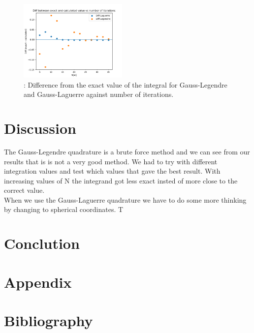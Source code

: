 \documentclass{article}
\begin{document}
\begin{figure}[hbt]
\begin{center}
    \includegraphics[width=200px]{Leg_lag_diff.png}
    \caption{: Difference from the exact value of the integral for Gauss-Legendre and Gauss-Laguerre against number of iterations.}
    \label{fig:diff}
\end{center}
\end{figure}


\section*{Discussion}
The Gauss-Legendre quadrature is a brute force method and we can see from our results that is is not a very good method. We had to try with different integration values and test which values that gave the best result. With increasing values of N the integrand got less exact insted of more close to the correct value.\\
When we use the Gauss-Laguerre quadrature we have to do some more thinking by changing to spherical coordinates. T

\section*{Conclution}

\section*{Appendix}


\section*{Bibliography}
\end{document}
